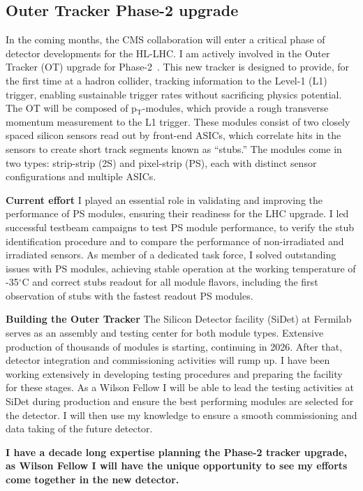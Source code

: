 {\begin{flushleft}
\subsection{Outer Tracker Phase-2 upgrade}
\vskip 5pt 
In the coming months, the CMS collaboration will enter a critical phase of detector developments for the HL-LHC. I am actively involved in the Outer Tracker (OT) upgrade for Phase-2~\cite{[5]}. This new tracker is designed to provide, for the first time at a hadron collider, tracking information to the Level-1 (L1) trigger, enabling sustainable trigger rates without sacrificing physics potential. The OT will be composed of p$_{\mathrm{T}}$-modules, which provide a rough transverse momentum measurement to the L1 trigger. These modules consist of two closely spaced silicon sensors read out by front-end ASICs, which correlate hits in the sensors to create short track segments known as ``stubs.'' The modules come in two types: strip-strip (2S) and pixel-strip (PS), each with distinct sensor configurations and multiple ASICs.

\textbf{Current effort}
I played an essential role in validating and improving the performance of PS modules, ensuring their readiness for the LHC upgrade. I led successful testbeam campaigns to test PS module performance, to verify the stub identification procedure and to compare the performance of non-irradiated and irradiated sensors. As member of a dedicated task force, I solved outstanding issues with PS modules, achieving stable operation at the working temperature of -35$^{\circ}$C and correct stubs readout for all module flavors, including the first observation of stubs with the fastest readout PS modules.  

\textbf{Building the Outer Tracker}
The Silicon Detector facility (SiDet) at Fermilab serves as an assembly and testing center for both module types. Extensive production of thousands of modules is starting, continuing in 2026. After that, detector integration and commissioning activities will rump up. I have been working extensively in developing testing procedures and preparing the facility for these stages. As a Wilson Fellow I will be able to lead the testing activities at SiDet during production and ensure the best performing modules are selected for the detector. I will then use my knowledge to ensure a smooth commissioning and data taking of the future detector.

\textbf{I have a decade long expertise planning the Phase-2 tracker upgrade, as Wilson Fellow I will have the unique opportunity to see my efforts come together in the new detector.} 





\end{flushleft}}
